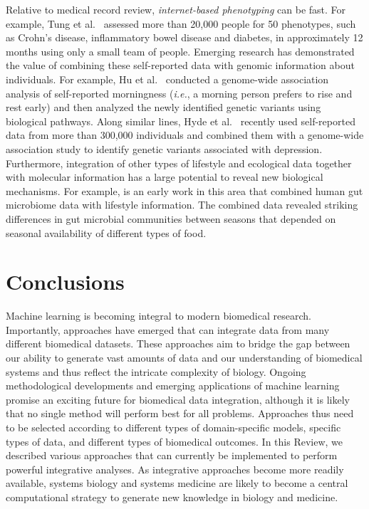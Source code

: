 \documentclass[5p]{elsarticle}
\newcommand{\ie}{\emph{i.e.}\xspace}
\newcommand{\rev}[1]{{\color{black}#1}}
\begin{document}
Relative to medical record review, {\em internet-based phenotyping} can be \rev{fast. For example, Tung et al.~\cite{Tung2011efficient} assessed more than 20,000 people for 50 phenotypes, such as Crohn's disease, inflammatory bowel disease and diabetes, in approximately 12 months using only a small team of people.}
Emerging research has demonstrated the value of combining these self-reported data with genomic information about individuals.
For example, Hu et al.~\cite{Hu2016gwas} conducted a genome-wide association analysis of self-reported morningness (\ie, a morning person prefers to rise and rest early) and then analyzed the newly identified genetic variants using biological pathways.
Along similar lines, Hyde et al.~\cite{Hyde2016identification} recently used self-reported data from more than 300,000 individuals and combined them with a genome-wide association study to identify genetic variants associated with depression.
Furthermore, integration of other types of lifestyle and ecological data together with molecular information has a large potential to reveal new biological mechanisms.
For example, \cite{Smits2017seasonal} is an early work in this area that combined human gut microbiome data with lifestyle information.
The combined data revealed striking differences in gut microbial communities between seasons that depended on seasonal availability of different types of food.

\section{Conclusions}

Machine learning is becoming integral to modern biomedical research.
Importantly, \rev{approaches have emerged that can integrate data from many different biomedical datasets.}
These approaches aim to bridge the gap between our ability to generate vast amounts of data and our understanding of biomedical systems and thus reflect the intricate complexity of biology.
Ongoing methodological developments and emerging applications of machine learning promise an exciting future for biomedical data integration, although it is likely that no single method will perform best for all \rev{problems}.
Approaches thus need to be selected according to different types of domain-specific models, specific types of data, and different types of biomedical outcomes.
In this Review, we described various \rev{approaches that} can currently be implemented to perform powerful integrative analyses.
As integrative approaches \rev{become} more readily available, systems biology and systems medicine are likely to become a central computational strategy to generate new knowledge in biology and medicine.
\end{document}
